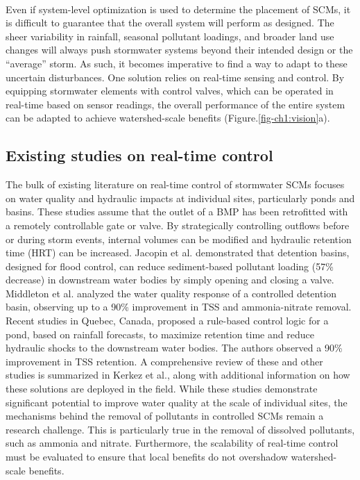 \

Even if system-level optimization is used to determine the placement of SCMs\cite{Ciou2012OptimizationWatershed,Zhen2004OptimalScale}, it is difficult to guarantee that the overall system will perform as designed.
The sheer variability in rainfall\cite{Chaubey1999UncertaintyRainfall}, seasonal pollutant loadings\cite{Ouyang2006AssessmentQuality}, and broader land use changes\cite{Goonetilleke2005UnderstandingManagement} will always push stormwater systems beyond their intended design or the ``average'' storm\cite{DepartmentofEnvironmentalProtection2006PennsylvaniaManual}.
As such, it becomes imperative to find a way to adapt to these uncertain disturbances.
One solution relies on real-time sensing and control.
By equipping stormwater elements with control valves, which can be operated in real-time based on sensor readings, the overall performance of the entire system can be adapted to achieve watershed-scale benefits (Figure.\ref{fig-ch1:vision}a). 

\subsection{Existing studies on real-time control}

The bulk of existing literature on real-time control of stormwater SCMs focuses on water quality and hydraulic impacts at individual sites, particularly ponds and basins.
These studies assume that the outlet of a BMP has been retrofitted with a remotely controllable gate or valve.
By strategically controlling outflows before or during storm events, internal volumes can be modified and hydraulic retention time (HRT) can be increased.
Jacopin et al.\cite{Jacopin2001OptimisationBasins} demonstrated that detention basins, designed for flood control, can reduce sediment-based pollutant loading (57\% decrease) in downstream water bodies by simply opening and closing a valve.
Middleton et al.\cite{Middleton2008WaterBasin} analyzed the water quality response of a controlled detention basin, observing up to a 90\% improvement in TSS and ammonia-nitrate removal.
Recent studies\cite{Muschalla2014Ecohydraulic-drivenBasins,
  Gaborit2013ImprovingForecasts,Gaborit2015ExploringPonds} in Quebec, Canada,
proposed a rule-based control logic for a pond, based on rainfall forecasts, to
maximize retention time and  reduce hydraulic shocks to the downstream water
bodies. The authors observed a 90\% improvement in TSS retention. A
comprehensive review of these and other studies is summarized in Kerkez et al.\cite{Kerkez2016SmarterSystems}, along with additional information on how these solutions are deployed in the field. 
While these studies demonstrate significant potential to improve water quality at the scale of individual sites, the mechanisms behind the removal of pollutants in controlled SCMs remain a research challenge. This is particularly true in the removal of dissolved pollutants, such as ammonia and nitrate. Furthermore, the scalability of  real-time control must be evaluated to ensure that local benefits do not overshadow watershed-scale benefits. 

